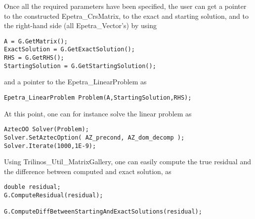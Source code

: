 Once all the required parameters have been specified, the user can get a
pointer to the constructed Epetra\_CrsMatrix, to the exact and starting
solution, and to the right-hand side (all Epetra\_Vector's) by using
\begin{verbatim}
A = G.GetMatrix();
ExactSolution = G.GetExactSolution();
RHS = G.GetRHS();
StartingSolution = G.GetStartingSolution();
\end{verbatim}
and a pointer to the Epetra\_LinearProblem as
\begin{verbatim}  
Epetra_LinearProblem Problem(A,StartingSolution,RHS);
\end{verbatim}
At this point, one can for instance solve the linear problem as
\begin{verbatim}  
AztecOO Solver(Problem);
Solver.SetAztecOption( AZ_precond, AZ_dom_decomp );  
Solver.Iterate(1000,1E-9);
\end{verbatim}
Using Trilinos\_Util\_MatrixGallery, one can easily compute the true
residual and the difference between computed and exact solution, as
\begin{verbatim} 
double residual;
G.ComputeResidual(residual);
  
G.ComputeDiffBetweenStartingAndExactSolutions(residual);
\end{verbatim}


\medskip

